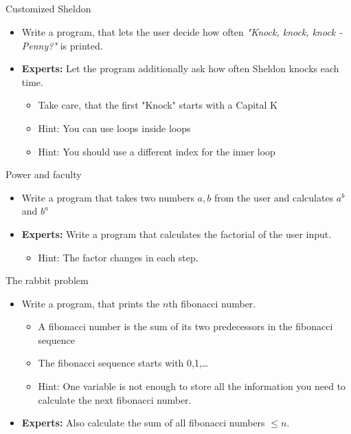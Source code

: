 \subsection{}
\begin{frame}{Customized Sheldon}
	\begin{itemize}
		\item Write a program, that lets the user decide how often \textit{"Knock, knock, knock - Penny?"} is printed.
		\item \textbf{Experts:} Let the program additionally ask how often Sheldon knocks each time.
		\begin{itemize}
			\item Take care, that the first "Knock" starts with a Capital K
			\item<2-> Hint: You can use loops inside loops
			\item<3-> Hint: You should use a different index for the inner loop
		\end{itemize}
	\end{itemize}
\end{frame}
\begin{frame}{Power and faculty}
	\begin{itemize}
		\item Write a program that takes two numbers $a, b$ from the user and calculates $a^b$ and $b^a$
		\item \textbf{Experts:} Write a program that calculates the factorial of the user input.
		\begin{itemize}
			\item<2-> Hint: The factor changes in each step.
		\end{itemize}
	\end{itemize}
\end{frame}
\begin{frame}{The rabbit problem}
	\begin{itemize}
		\item Write a program, that prints the $n$th fibonacci number.
		\begin{itemize}
			\item A fibonacci number is the sum of its two predecessors in the fibonacci sequence
			\item The fibonacci sequence starts with 0,1,\dots
			\item<2-> Hint: One variable is not enough to store all the information you need to calculate the next fibonacci number.
		\end{itemize}
		\item \textbf{Experts:} Also calculate the sum of all fibonacci numbers $\leq n$.
	\end{itemize}
\end{frame}

